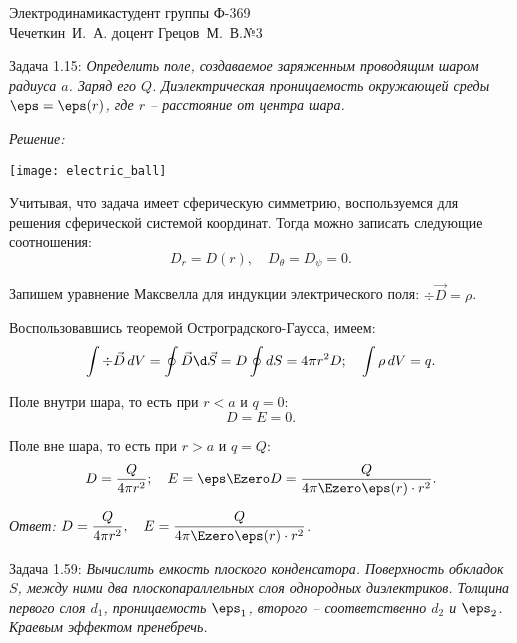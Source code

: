 





\newcommand{\ds}{\displaystyle}


{Электродинамика}{студент группы Ф-369\\Чечеткин~И.~А.}
{доцент Грецов~М.~В.}{№3}

Задача 1.15: \emph{Определить поле, создаваемое заряженным проводящим шаром
радиуса \( a \). Заряд его \( Q \). Диэлектрическая проницаемость окружающей
среды \( \eps = \eps(r) \), где \( r \) -- расстояние от центра шара.}

\vspace*{2em}
\emph{Решение:}

\begin{minipage}{.4\textwidth}
    \texttt{[image: electric\_ball]}
\end{minipage}
\begin{minipage}{.55\textwidth}
Учитывая, что задача имеет сферическую симметрию, воспользуемся для решения
сферической системой координат. Тогда можно записать следующие соотношения:
\[
	D_r = D(r), \quad D_\theta = D_\psi = 0.
\]

Запишем уравнение Максвелла для индукции электрического поля:
\( \div{\vec{D}} = \rho \).
\end{minipage}

Воспользовавшись теоремой Остроградского-Гаусса, имеем:
\[
	\int \div\vec{D}\,dV = \oint \vec{D}\d\vec{S} = D \oint dS = 4\pi r^2 D; \quad
	\int \rho\,dV = q.
\]

Поле внутри шара, то есть при \( r < a \) и \( q = 0 \):
\[
	D = E = 0.
\]

Поле вне шара, то есть при \( r > a \) и \( q = Q \):
\[
	D = \frac{Q}{4\pi r^2}; \quad
	E = \eps\Ezero D = \frac{Q}{4\pi\Ezero\eps(r) \cdot r^2}.
\]

\vspace*{2em}   
\emph{Ответ:} \( \ds D = \frac{Q}{4\pi r^2}, \quad
E = \frac{Q}{4\pi\Ezero\eps(r) \cdot r^2} \).

\newpage
Задача 1.59: \emph{Вычислить емкость плоского конденсатора. Поверхность
обкладок \( S \), между ними два плоскопараллельных слоя однородных
диэлектриков. Толщина первого слоя \( d_1 \), проницаемость \( \eps_1 \),
второго -- соответственно \( d_2 \) и \( \eps_2 \). Краевым эффектом
пренебречь.}

